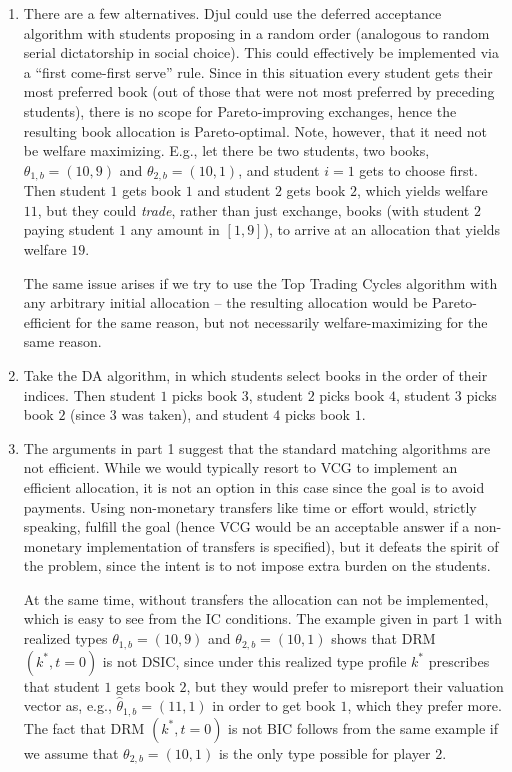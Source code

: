\documentclass[a4paper]{article}
\begin{document}
	\begin{enumerate}
		\item There are a few alternatives. Djul could use the deferred acceptance algorithm with students proposing in a random order (analogous to random serial dictatorship in social choice). This could effectively be implemented via a ``first come-first serve'' rule. Since in this situation every student gets their most preferred book (out of those that were not most preferred by preceding students), there is no scope for Pareto-improving exchanges, hence the resulting book allocation is Pareto-optimal. Note, however, that it need not be welfare maximizing. E.g., let there be two students, two books, $\theta_{1,b} = (10,9)$ and $\theta_{2,b} = (10,1)$, and student $i=1$ gets to choose first. Then student $1$ gets book $1$ and student $2$ gets book $2$, which yields welfare $11$, but they could \emph{trade}, rather than just exchange, books (with student $2$ paying student $1$ any amount in $[1,9]$), to arrive at an allocation that yields welfare $19$.
		
		The same issue arises if we try to use the Top Trading Cycles algorithm with any arbitrary initial allocation -- the resulting allocation would be Pareto-efficient for the same reason, but not necessarily welfare-maximizing for the same reason.
		
		\item Take the DA algorithm, in which students select books in the order of their indices. Then student $1$ picks book $3$, student $2$ picks book $4$, student $3$ picks book $2$ (since $3$ was taken), and student $4$ picks book $1$.
		
		\item The arguments in part 1 suggest that the standard matching algorithms are not efficient. While we would typically resort to VCG to implement an efficient allocation, it is not an option in this case since the goal is to avoid payments. Using non-monetary transfers like time or effort would, strictly speaking, fulfill the goal (hence VCG would be an acceptable answer if a non-monetary implementation of transfers is specified), but it defeats the spirit of the problem, since the intent is to not impose extra burden on the students.
		
		At the same time, without transfers the allocation can not be implemented, which is easy to see from the IC conditions. The example given in part 1 with realized types $\theta_{1,b} = (10,9)$ and $\theta_{2,b} = (10,1)$ shows that DRM $(k^*,t=0)$ is not DSIC, since under this realized type profile $k^*$ prescribes that student $1$ gets book $2$, but they would prefer to misreport their valuation vector as, e.g., $\hat{\theta}_{1,b} =(11,1)$ in order to get book $1$, which they prefer more. The fact that DRM $(k^*,t=0)$ is not BIC follows from the same example if we assume that $\theta_{2,b} = (10,1)$ is the only type possible for player $2$.
		

\end{enumerate}
\end{document}
